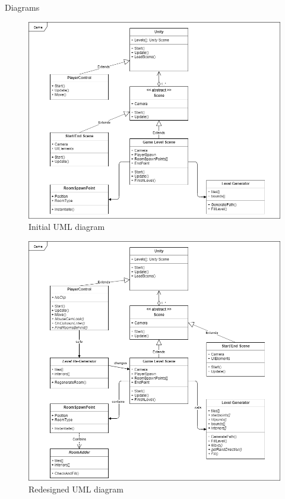\documentclass[final]{cmpreport}
\begin{document}
\begin{section}{Diagrams}
\begin{figure}[H]
    \centering
    \includegraphics[width=\textwidth]{img/uml1.png}
    \caption{Initial UML diagram}
    \label{fig:uml1}
\end{figure}

\begin{figure}[H]
    \centering
    \includegraphics[width=\textwidth]{img/uml2.png}
    \caption{Redesigned UML diagram}
    \label{fig:uml2}
\end{figure}



\end{section}
\end{document}
